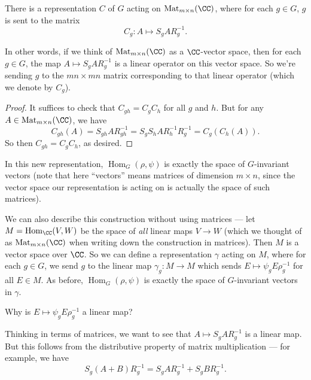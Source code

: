 \begin{lemma}
There is a representation $C$ of $G$ acting on $\operatorname{Mat}_{m \times n}(\CC)$, where for each $g \in G$, $g$ is sent to the matrix \[C_g : A \mapsto S_gAR_g^{-1}.\] 
\end{lemma}

In other words, if we think of $\operatorname{Mat}_{m \times n}(\CC)$ as a $\CC$-vector space, then for each $g \in G$, the map $A \mapsto S_gAR_g^{-1}$ is a linear operator on this vector space. So we're sending $g$ to the $mn \times mn$ matrix corresponding to that linear operator (which we denote by $C_g$).

\begin{proof}
It suffices to check that $C_{gh} = C_gC_h$ for all $g$ and $h$. But for any $A \in \operatorname{Mat}_{m \times n}(\CC)$, we have \[C_{gh}(A) = S_{gh}AR_{gh}^{-1} = S_gS_hAR_h^{-1}R_g^{-1} = C_g(C_h(A)).\] So then $C_{gh} = C_gC_h$, as desired. 
\end{proof}

In this new representation, $\operatorname{Hom}_G(\rho, \psi)$ is exactly the space of $G$-invariant vectors (note that here ``vectors'' means matrices of dimension $m \times n$, since the vector space our representation is acting on is actually the space of such matrices). 

We can also describe this construction without using matrices --- let $M = \operatorname{Hom}_{\CC}(V, W)$ be the space of \emph{all} linear maps $V \to W$ (which we thought of as $\operatorname{Mat}_{m \times n}(\CC)$ when writing down the construction in matrices). Then $M$ is a vector space over $\CC$. So we can define a representation $\gamma$ acting on $M$, where for each $g \in G$, we send $g$ to the linear map $\gamma_g : M \to M$ which sends $E \mapsto \psi_gE\rho_g^{-1}$ for all $E \in M$. As before, $\operatorname{Hom}_G(\rho, \psi)$ is exactly the space of $G$-invariant vectors in $\gamma$. 

\begin{question}
Why is $E \mapsto \psi_gE\rho_g^{-1}$ a linear map?
\end{question}

\begin{ans}
Thinking in terms of matrices, we want to see that $A \mapsto S_gAR_g^{-1}$ is a linear map. But this follows from the distributive property of matrix multiplication --- for example, we have \[S_g(A + B)R_g^{-1} = S_gAR_g^{-1} + S_gBR_g^{-1}.\] 
\end{ans}

